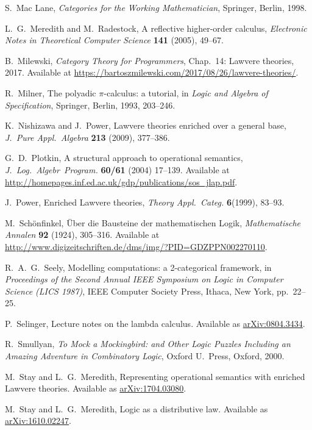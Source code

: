 \documentclass{amsart}
\theoremstyle{definition}
\begin{document}
\begin{thebibliography}{100}
 S.\ Mac Lane, \textsl{Categories for the Working Mathematician}, Springer, Berlin, 1998.  

 L.\ G.\ Meredith and M.\ Radestock, A reflective higher-order calculus,
\textsl{Electronic Notes in Theoretical Computer Science} \textbf{141} (2005), 49--67.

 B.\ Milewski, \textsl{Category Theory for Programmers}, Chap.\ 14: Lawvere theories, 2017.   Available at \href{https://bartoszmilewskiski.com/2017/08/26/lawvere-theories/}{https://bartoszmilewski.com/2017/08/26/lawvere-theories/}.

 R.\ Milner, The polyadic {$\pi$}-calculus: a tutorial, in \textsl{Logic and Algebra of Specification}, Springer, Berlin, 1993, 203--246.

 K.\ Nishizawa and J.\ Power, Lawvere theories enriched over a general base, \textsl{J.\ Pure Appl.\ Algebra}  \textbf{213} (2009), 377--386.

 G.\ D.\ Plotkin, A structural approach to operational semantics, \textsl{J.\ Log.\ Algebr\ Program.} \textbf{60/61} (2004) 17--139.  Available at \href{http://homepages.inf.ed.ac.uk/gdp/publications/sos_jlap.pdf}{http://homepages.inf.ed.ac.uk/gdp/publications/sos\_jlap.pdf}.

 J.\ Power, Enriched Lawvere theories, \textsl{Theory Appl.\ Categ.} \textbf{6}(1999), 83--93.

 M.\ Sch\"{o}nfinkel, \"Uber die Bausteine der mathematischen Logik, 
 \textsl{Mathematische Annalen} \textbf{92} (1924), 305--316.  Available at \href{http://www.digizeitschriften.de/dms/img/?PID=GDZPPN002270110}{http://www.digizeitschriften.de/dms/img/?PID=GDZPPN002270110}.
 
 R.\ A.\ G.\ Seely, Modelling computations: a 2-categorical framework, in
\textsl{Proceedings of the Second Annual IEEE Symposium on Logic in Computer Science (LICS 1987)}, IEEE Computer Society Press, Ithaca, New York, pp.\ 22--25.
 
  P.\ Selinger, Lecture notes on the lambda calculus.  Available as 
 \href{https://arxiv.org/abs/0804.3434}{arXiv:0804.3434}.

 R.\ Smullyan, \textsl{To Mock a Mockingbird: and Other Logic Puzzles Including an Amazing Adventure in Combinatory Logic}, Oxford U.\ Press, Oxford, 2000.
	
 M.\ Stay and L.\ G.\ Meredith, Representing operational semantics 
with enriched Lawvere theories.  Available as
\href{https://arxiv.org/abs/1704.03080}{arXiv:1704.03080}.

 M.\ Stay and L.\ G.\ Meredith, Logic as a distributive law.  Available as \href{https://arxiv.org/abs/1610.02247}{arXiv:1610.02247}.

\end{thebibliography}
\end{document}
